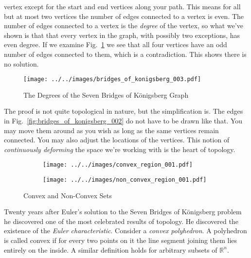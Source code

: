     vertex except for the start and end vertices along your path. This means for
    all but at most two vertices the number of edges connected to a vertex is
    even. The number of edges connected to a vertex is the \textit{degree} of
    the vertex, so what we've shown is that that every vertex in the graph,
    with possibly two exceptions, has even degree. If we examine
    Fig.~\ref{fig:bridges_of_konigsberg_003} we see that all four vertices
    have an odd number of edges connected to them, which is a contradiction.
    This shows there is no solution.
    \begin{figure}[H]
        \centering
        \texttt{[image: ../../images/bridges\_of\_konigsberg\_003.pdf]}
        \caption{The Degrees of the Seven Bridges of K\"{o}nigsberg Graph}
        \label{fig:bridges_of_konigsberg_003}
    \end{figure}
    The proof is not quite topological in nature, but the simplification is.
    The edges in Fig.~\ref{fig:bridges_of_konigsberg_002} do not have to be
    drawn like that. You may move them around as you wish as long as the same
    vertices remain connected. You may also adjust the locations of the
    vertices. This notion of \textit{continuously deforming} the space we're
    working with is the heart of topology.
    \par\hfill\par
    \begin{figure}
        \centering
        \begin{subfigure}[b]{0.49\textwidth}
            \texttt{[image: ../../images/convex\_region\_001.pdf]}
        \end{subfigure}
        \hfill
        \begin{subfigure}[b]{0.49\textwidth}
            \texttt{[image: ../../images/non\_convex\_region\_001.pdf]}
        \end{subfigure}
        \caption{Convex and Non-Convex Sets}
        \label{fig:convex_and_non_convex}
    \end{figure}
    Twenty years after Euler's solution to the Seven Bridges of K\"{o}nigsberg
    problem he discovered one of the most celebrated results of topology. He
    discovered the existence of the \textit{Euler characteristic}. Consider a
    \textit{convex polyhedron}. A polyhedron is called convex if for every
    two points on it the line segment joining them lies entirely on the inside.
    A similar definition holds for arbitrary subsets of $\mathbb{R}^{n}$.
